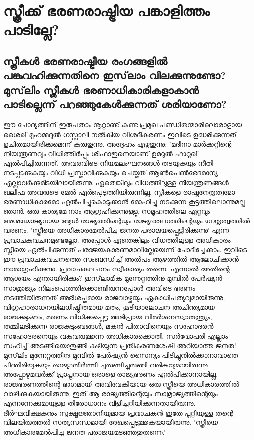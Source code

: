 \chapter{സ്ത്രീക്ക് ഭരണരാഷ്ട്രീയ പങ്കാളിത്തം പാടില്ലേ? }
\section{ സ്ത്രീകള്‍ ഭരണരാഷ്ട്രീയ രംഗങ്ങളില്‍ പങ്കുവഹിക്കുന്നതിനെ ഇസ്‌ലാം വിലക്കുന്നുണ്ടോ? മുസ്‌ലിം സ്ത്രീകള്‍ ഭരണാധികാരികളാകാന്‍ പാടില്ലെന്ന് പറഞ്ഞുകേള്‍ക്കുന്നത് ശരിയാണോ?}
    
 ഈ ചോദ്യത്തിന് ഇരുപതാം നൂറ്റാണ്ട് കണ്ട പ്രമുഖ പണ്ഡിതന്മാരിലൊരാളായ ശൈഖ് മുഹമ്മദുല്‍ ഗസ്സാലി നല്‍കിയ വിശദീകരണം ഇവിടെ ഉദ്ധരിക്കുന്നത് ഉചിതമായിരിക്കുമെന്ന് കരുതുന്നു. അദ്ദേഹം എഴുതുന്നു: 'മദീനാ മാര്‍ക്കറ്റിന്റെ നിയന്ത്രണവും വിധിത്തീര്‍പ്പും ശിഫാഇനെയാണ് ഉമറുല്‍ ഫാറൂഖ് ഏല്‍പിച്ചിരുന്നത്. അവരവിടെ നിയമലംഘനങ്ങള്‍ തടയുകയും നീതി നടപ്പാക്കുകയും വിധി പ്രസ്താവിക്കുകയും ചെയ്തത് ആണ്‍പെണ്‍ഭേദമന്യേ എല്ലാവര്‍ക്കുമിടയിലായിരുന്നു. ഏതെങ്കിലും വിധത്തിലുള്ള നിയന്ത്രണങ്ങള്‍ ഖലീഫ അവരുടെ മേല്‍ ഏര്‍പ്പെടുത്തിയിരുന്നില്ല.
സ്ത്രീകളെ രാഷ്ട്രനേതൃത്വമോ ഭരണാധികാരമോ ഏല്‍പിച്ചുകൊടുക്കാന്‍ മോഹിച്ചു നടക്കുന്ന കൂട്ടത്തിലൊന്നുമല്ല ഞാന്‍. ഒരു കാര്യമേ നാം ആഗ്രഹിക്കുന്നുള്ളൂ. സമൂഹത്തിലെ ഏറ്റവും അനുയോജ്യനായ ആള്‍ രാജ്യത്തിന്റെയും രാജ്യഭരണത്തിന്റെയും നേതൃത്വത്തില്‍ വരണം.
'സ്ത്രീയെ അധികാരമേല്‍പിച്ച ജനത പരാജയപ്പെട്ടിരിക്കുന്നു' എന്ന പ്രവാചകവചനമുണ്ടല്ലോ. അപ്പോള്‍ ഏതെങ്കിലും വിധത്തിലുള്ള അധികാരം സ്ത്രീയെ ഏല്‍പിക്കുന്നത് പരാജയകാരണമാവില്ലേയെന്ന് ചോദിച്ചേക്കാം. ഇവിടെ ഈ പ്രവാചകവചനത്തെ സംബന്ധിച്ച് അല്‍പം ആഴത്തില്‍ ആലോചിക്കാന്‍ നാമാഗ്രഹിക്കുന്നു. പ്രവാചകവചനം സ്വീകാര്യം തന്നെ. എന്നാല്‍ അതിന്റെ ആശയം എന്തായിരിക്കും?
ഇസ്‌ലാമിക മുന്നേറ്റത്തിനു മുമ്പില്‍ പേര്‍ഷ്യന്‍ സാമ്രാജ്യം നിലംപൊത്തിക്കൊണ്ടിരുന്നപ്പോള്‍ അവിടെ ഭരണം നടത്തിയിരുന്നത് അഭിശപ്തമായ രാജവാഴ്ചയും ഏകാധിപത്യവുമായിരുന്നു. വിഗ്രഹാരാധനയിലധിഷ്ഠിതമായ മതം, കൂടിയാലോചന അചിന്ത്യമായ രാജകുടുംബം, മരണം വിധിക്കപ്പെട്ട അഭിപ്രായ വിമര്‍ശനസ്വാതന്ത്യ്രം, തമ്മിലടിക്കുന്ന രാജകുടുംബങ്ങള്‍, മകന്‍ പിതാവിനെയും സഹോദരന്‍ സഹോദരനെയും വകവരുത്തുന്ന അധികാരക്കൊതി, സര്‍വോപരി എല്ലാം സഹിച്ച് അടങ്ങിയൊതുങ്ങി കഴിയുന്ന പ്രതികരണശേഷി അറിയാത്ത ജനത!
മുസ്‌ലിം മുന്നേറ്റത്തിനു മുമ്പില്‍ പേര്‍ഷ്യന്‍ സൈന്യം പിടിച്ചുനില്‍ക്കാനാവാതെ പിന്തിരിയുകയും രാജ്യാതിര്‍ത്തി ചുരുങ്ങിച്ചുരുങ്ങി വരികയുമായിരുന്നു. അപ്പോഴുമവര്‍ക്ക് പ്രാപ്തനായ ഒരാളെ രാജ്യഭരണം ഏല്‍പിക്കാനായില്ല. രാജഭരണത്തിന്റെ ഭാഗമായി അവിവേകിയായ ഒരു സ്ത്രീയെ അധികാരത്തില്‍ വാഴിക്കുകയായിരുന്നു. ഇത് ആ രാജ്യത്തിന്റെയും സാമ്രാജ്യത്തിന്റെയും എന്നന്നേക്കുമായുള്ള തിരോധാനം വിളിച്ചറിയിക്കുന്നതായിരുന്നു. ദീര്‍ഘവീക്ഷകനും സൂക്ഷ്മജ്ഞാനിയുമായ പ്രവാചകന്‍ ഇതേ പ്പറ്റിയുള്ള തന്റെ വിലയിരുത്തല്‍ സത്യസന്ധമായി രേഖപ്പെടുത്തുകയായിരുന്നു. 'സ്ത്രീയെ അധികാരമേല്‍പിച്ച ജനത പരാജയമടഞ്ഞതുതന്നെ.'
